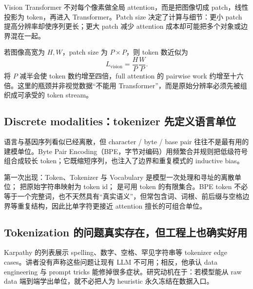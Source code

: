 Vision Transformer 不对每个像素做全局 attention，而是把图像切成 patch，线性投影为 token，再进入 Transformer。Patch size 决定了计算与细节：更小 patch 提高分辨率却使序列更长；更大 patch 减少 attention 成本却可能把多个对象或边界混在一起。


若图像高宽为 $H,W$，patch size 为 $P\times P$，则 token 数近似为
\[
L_{\mathrm{vision}}=\frac{H}{P}\frac{W}{P}.
\]
将 $P$ 减半会使 token 数约增至四倍，full attention 的 pairwise work 约增至十六倍。这里的瓶颈并非视觉数据“不能用 Transformer”，而是原始分辨率必须先被组织成可承受的 token stream。

\subsection{Discrete modalities：tokenizer 先定义语言单位}

语言与基因序列看似已经离散，但 character / byte / base pair 往往不是最有用的建模单位。Byte Pair Encoding（BPE，字节对编码）用频繁合并规则把低级符号组合成较长 token；它既缩短序列，也注入了边界和重复模式的 inductive bias。


\begin{knowledgebox}{第一次出现：Token、Tokenizer 与 Vocabulary}
 是模型一次处理和寻址的离散单位； 把原始字符串映射为 token id； 是可用 token 的有限集合。BPE token 不必等于一个完整词，也不天然具有“真实语义”，但常包含词、词根、前后缀与空格边界等重复结构，因此比单字符更接近 attention 擅长的可组合单位。
\end{knowledgebox}

\subsection{Tokenization 的问题真实存在，但工程上也确实好用}

Karpathy 的列表展示 spelling、数字、空格、罕见字符串等 tokenizer edge cases。讲者没有声称这些问题让现有 LLM 不可用；相反，他承认 data engineering 与 prompt tricks 能修掉很多症状。研究动机在于：若模型能从 raw data 端到端学出单位，就不必把人为 heuristic 永久冻结在数据入口。


